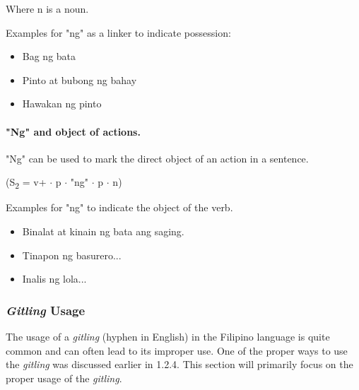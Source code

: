 Where n is a noun. \\

\begin{example}
      Examples for "ng" as a linker to indicate possession:
\end{example}
\begin{itemize}
      \item Bag ng bata
      \item Pinto at bubong ng bahay
      \item Hawakan ng pinto
\end{itemize}

\paragraph{"Ng" and object of actions.}"Ng" can be used to mark the direct object
of an action in a sentence.
\begin{center}
      (S\textsubscript{2} = v+ \(\cdot\) p \(\cdot\) "ng" \(\cdot\) p \(\cdot\) n)
\end{center}

\begin{example}
      Examples for "ng" to indicate the object of the verb.
\end{example}
\begin{itemize}
      \item Binalat at kinain ng bata ang saging.
      \item Tinapon ng basurero...
      \item Inalis ng lola...
\end{itemize}

\subsubsection{\textit{Gitling} Usage}
The usage of a \textit{\textit{gitling}} (hyphen in English) in the Filipino language is quite common and can often lead to its improper use. One of the proper ways to use the \textit{\textit{gitling}} was discussed earlier in 1.2.4. This section will primarily focus on the proper usage of the \textit{\textit{gitling}}.

